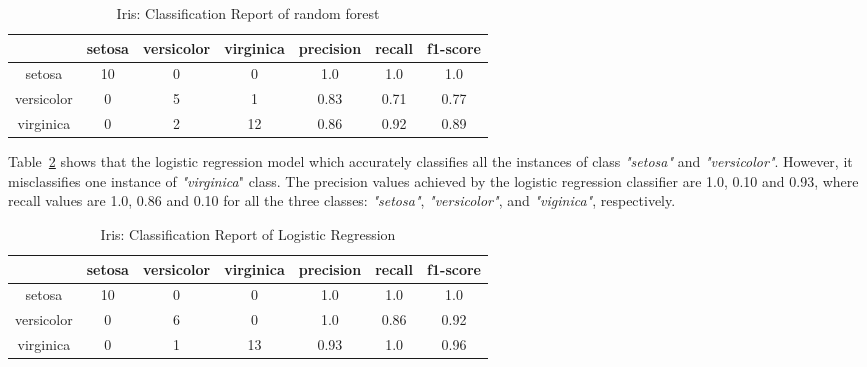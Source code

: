 \documentclass[english]{tktltiki2}
\theoremstyle{definition}
\theoremstyle{remark}
\begin{document}
\begin{table}[H]
	\centering
	\caption{Iris: Classification Report of random forest}
	\label{table:rf_model_iris_report}
	\begin{tabular}{@{}ccccccc@{}}
		\toprule
		& setosa & versicolor & virginica & precision & recall & f1-score \\ \hline
		
		\multicolumn{1}{|c|}{setosa} & \multicolumn{1}{c|}{10} & \multicolumn{1}{c|}{0} & \multicolumn{1}{c|}{0} & \multicolumn{1}{c|}{1.0} & \multicolumn{1}{c|}{1.0} & \multicolumn{1}{c|}{1.0} \\ \hline
		
		\multicolumn{1}{|c|}{versicolor} & \multicolumn{1}{c|}{0} & \multicolumn{1}{c|}{5} & \multicolumn{1}{c|}{1} & \multicolumn{1}{c|}{0.83} & \multicolumn{1}{c|}{0.71} & \multicolumn{1}{c|}{0.77} \\ \hline
		
		\multicolumn{1}{|c|}{virginica} & \multicolumn{1}{c|}{0} & \multicolumn{1}{c|}{2} & \multicolumn{1}{c|}{12} & \multicolumn{1}{c|}{0.86} & \multicolumn{1}{c|}{0.92} & \multicolumn{1}{c|}{0.89} \\ \hline

	\end{tabular}
\end{table}

Table~\ref{table:lr_model_iris_report} shows that the logistic regression model which accurately classifies all the instances of class \textit{"setosa"} and \textit{"versicolor"}. However, it misclassifies one instance of \textit{"virginica}" class. The precision values achieved by the logistic regression classifier are 1.0, 0.10 and 0.93, where recall values are 1.0, 0.86 and 0.10 for all the three classes: \textit{"setosa"}, \textit{"versicolor"}, and \textit{"viginica"}, respectively.

\begin{table}[H]
	\centering
	\caption{Iris: Classification Report of Logistic Regression}
	\label{table:lr_model_iris_report}
	\begin{tabular}{@{}ccccccc@{}}
		\toprule
		& setosa & versicolor & virginica & precision & recall & f1-score \\ \hline
		
		\multicolumn{1}{|c|}{setosa} & \multicolumn{1}{c|}{10} & \multicolumn{1}{c|}{0} & \multicolumn{1}{c|}{0} & \multicolumn{1}{c|}{1.0} & \multicolumn{1}{c|}{1.0} & \multicolumn{1}{c|}{1.0} \\ \hline
		
		\multicolumn{1}{|c|}{versicolor} & \multicolumn{1}{c|}{0} & \multicolumn{1}{c|}{6} & \multicolumn{1}{c|}{0} & \multicolumn{1}{c|}{1.0} & \multicolumn{1}{c|}{0.86} & \multicolumn{1}{c|}{0.92} \\ \hline
		
		\multicolumn{1}{|c|}{virginica} & \multicolumn{1}{c|}{0} & \multicolumn{1}{c|}{1} & \multicolumn{1}{c|}{13} & \multicolumn{1}{c|}{0.93} & \multicolumn{1}{c|}{1.0} & \multicolumn{1}{c|}{0.96} \\ \hline
	\end{tabular}
\end{table}
\end{document}
